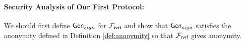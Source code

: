 %	
%	
%

\paragraph{Security Analysis of Our First Protocol:}
We should first define $ \mathsf{Gen}_{sign} $  for $ \mathcal{F}_{\textsf{rvrf}} $ and show that  $ \mathsf{Gen}_{sign} $ satisfies the anonymity defined in Definition \ref{def:anonymity} so that $ \mathcal{F}_{\textsf{rvrf}} $ gives anonymity. 



%	

